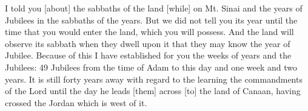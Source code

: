 \begin{translation}
    I told you [about] the sabbaths of the land [while] on Mt. Sinai and the years of
    Jubilees in the sabbaths of the years. But we did not tell you its year
    until the time that you would enter the land, which you will possess.
    And the land will observe its sabbath when they dwell upon it
    that they may know the year of Jubilee.
    Because of this I have established for you
    the weeks of years and the Jubilees: 49 Jubilees
    from the time of Adam to this day and one week
    and two years. It is still forty years
    away with regard to the learning the commandments of the Lord until the day he leads [them]
    across [to] the land of Canaan, having crossed the Jordan which is west of it.
\end{translation}